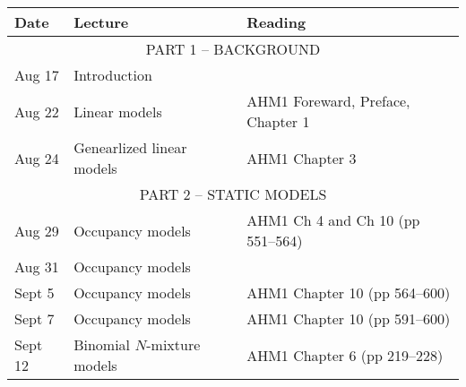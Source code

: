 \documentclass[12pt]{article}
\begin{document}
\begin{center}
\begin{tabular}[c]{lll}
\hline \hline
{\bf Date} & {\bf Lecture}                                & {\bf Reading}                                         \\
\hline
           \multicolumn{3}{c}{PART 1 -- BACKGROUND}                                                               \\
\hline
Aug 17     & Introduction                                 &                                                       \\
\hline
Aug 22     & Linear models                                & AHM1 Foreward, Preface, Chapter 1                     \\
Aug 24     & Genearlized linear models                    & AHM1 Chapter 3                                        \\
\hline
           \multicolumn{3}{c}{PART 2 -- STATIC MODELS}                                                            \\
\hline
Aug 29     & Occupancy models                             & AHM1 Ch 4 and Ch 10 (pp 551--564)                     \\
Aug 31     & Occupancy models                             &                                                       \\
\hline
Sept 5     & Occupancy models                             & AHM1 Chapter 10 (pp 564--600)                         \\
Sept 7     & Occupancy models                             & AHM1 Chapter 10 (pp 591--600)                         \\
\hline
Sept 12    & Binomial $N$-mixture models                  & AHM1 Chapter 6 (pp 219--228)                          \\

\end{tabular}
\end{center}
\end{document}
